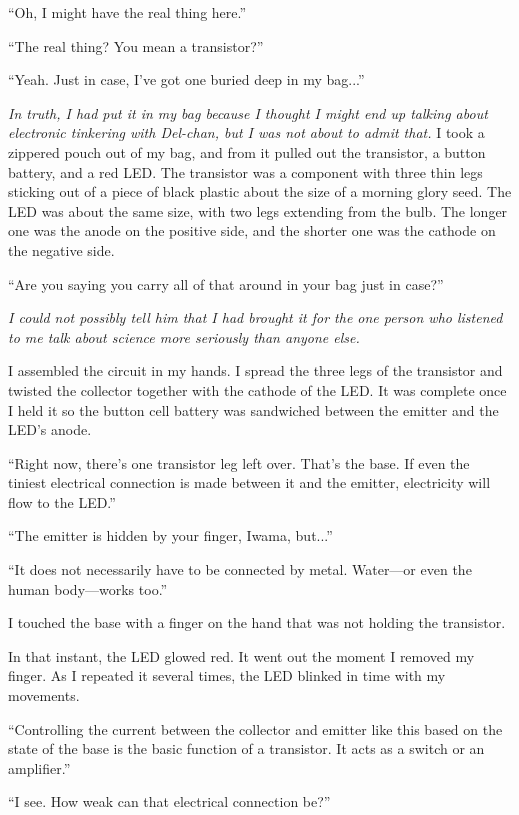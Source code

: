 \documentclass[
    a4paper,
    12pt,
    twoside,
    openany,
    UTF8,
    fontset=windows
]{ctexbook}
\begin{document}
``Oh, I might have the real thing here.''

``The real thing? You mean a transistor?''

``Yeah. Just in case, I've got one buried deep in my bag...''

\textit{In truth, I had put it in my bag because I thought I might end up talking about electronic tinkering with Del-chan, but I was not about to admit that.} I took a zippered pouch out of my bag, and from it pulled out the transistor, a button battery, and a red LED. The transistor was a component with three thin legs sticking out of a piece of black plastic about the size of a morning glory seed. The LED was about the same size, with two legs extending from the bulb. The longer one was the anode on the positive side, and the shorter one was the cathode on the negative side.

``Are you saying you carry all of that around in your bag just in case?''

\textit{I could not possibly tell him that I had brought it for the one person who listened to me talk about science more seriously than anyone else.}

I assembled the circuit in my hands. I spread the three legs of the transistor and twisted the collector together with the cathode of the LED. It was complete once I held it so the button cell battery was sandwiched between the emitter and the LED's anode.

``Right now, there's one transistor leg left over. That's the base. If even the tiniest electrical connection is made between it and the emitter, electricity will flow to the LED.''

``The emitter is hidden by your finger, Iwama, but...''

``It does not necessarily have to be connected by metal. Water---or even the human body---works too.''

I touched the base with a finger on the hand that was not holding the transistor.

In that instant, the LED glowed red. It went out the moment I removed my finger. As I repeated it several times, the LED blinked in time with my movements.

``Controlling the current between the collector and emitter like this based on the state of the base is the basic function of a transistor. It acts as a switch or an amplifier.''

``I see. How weak can that electrical connection be?''
\end{document}

